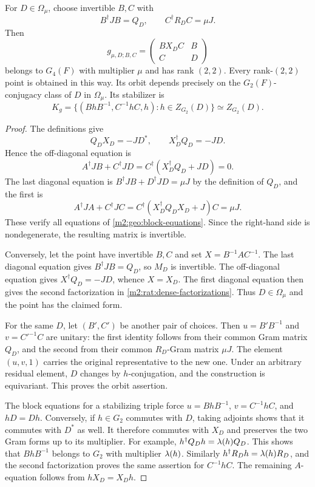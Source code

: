 \begin{proposition}\label{m2:rat:dense-param}
For $D\in\Omega_\mu$, choose invertible $B,C$ with
\begin{equation}\label{m2:rat:dense-factorizations}
 B^\dagger JB=Q_D,\qquad C^\dagger R_DC=\mu J.
\end{equation}
Then
\begin{equation}\label{m2:rat:dense-representative}
 g_{\mu,D;B,C}=
 \begin{pmatrix}BX_DC&B\\C&D\end{pmatrix}
\end{equation}
belongs to $G_4(F)$ with multiplier $\mu$ and has rank
$(2,2)$.  Every rank-$(2,2)$ point is obtained in this way.
Its orbit depends precisely on the $G_2(F)$-conjugacy class
of $D$ in $\Omega_\mu$.  Its stabilizer is
\begin{equation}\label{m2:rat:dense-stabilizer}
 K_g=\{(BhB^{-1},C^{-1}hC,h):h\in Z_{G_2}(D)\}
 \simeq Z_{G_2}(D).
\end{equation}
\end{proposition}

\begin{proof}
The definitions give
\[
 Q_DX_D=-JD^*,\qquad X_D^\dagger Q_D=-JD.
\]
Hence the off-diagonal equation is
\[
 A^\dagger JB+C^\dagger JD
 =C^\dagger(X_D^\dagger Q_D+JD)=0.
\]
The last diagonal equation is
$B^\dagger JB+D^\dagger JD=\mu J$ by the definition of
$Q_D$, and the first is
\[
 A^\dagger JA+C^\dagger JC
 =C^\dagger(X_D^\dagger Q_DX_D+J)C=\mu J.
\]
These verify all equations of \cref{m2:geo:block-equations}.
Since the right-hand side is nondegenerate, the resulting
matrix is invertible.

Conversely, let the point have invertible $B,C$ and set
$X=B^{-1}AC^{-1}$.  The last diagonal equation gives
$B^\dagger JB=Q_D$, so $M_D$ is invertible.  The
off-diagonal equation gives $X^\dagger Q_D=-JD$, whence
$X=X_D$.  The first diagonal equation then gives the second
factorization in \eqref{m2:rat:dense-factorizations}.  Thus
$D\in\Omega_\mu$ and the point has the claimed form.

For the same $D$, let $(B',C')$ be another pair of choices.
Then $u=B'B^{-1}$ and $v=C'^{-1}C$ are unitary: the first
identity follows from their common Gram matrix $Q_D$, and
the second from their common $R_D$-Gram matrix $\mu J$.
The element $(u,v,1)$ carries the original representative
to the new one.  Under an arbitrary residual element, $D$
changes by $h$-conjugation, and the construction is equivariant.
This proves the orbit assertion.

The block equations for a stabilizing triple force
$u=BhB^{-1}$, $v=C^{-1}hC$, and $hD=Dh$.
Conversely, if $h\in G_2$ commutes with $D$, taking adjoints
shows that it commutes with $D^*$ as well.  It therefore
commutes with $X_D$ and preserves the two Gram forms up to
its multiplier.  For example,
$h^\dagger Q_Dh=\lambda(h)Q_D$.  This shows that
$BhB^{-1}$ belongs to $G_2$ with multiplier $\lambda(h)$.
Similarly $h^\dagger R_Dh=\lambda(h)R_D$, and the second
factorization proves the same assertion for $C^{-1}hC$.
The remaining $A$-equation follows from $hX_D=X_Dh$.
\end{proof}

